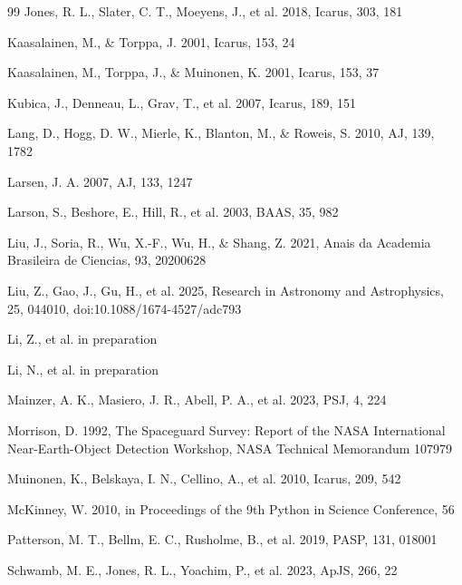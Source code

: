 \documentclass[referee]{raa}
\begin{document}
\begin{thebibliography}{99}
Jones, R. L., Slater, C. T., Moeyens, J., et al. 2018, Icarus, 303, 181

Kaasalainen, M., \& Torppa, J. 2001, Icarus, 153, 24

Kaasalainen, M., Torppa, J., \& Muinonen, K. 2001, Icarus, 153, 37

Kubica, J., Denneau, L., Grav, T., et al. 2007, Icarus, 189, 151

Lang, D., Hogg, D. W., Mierle, K., Blanton, M., \& Roweis, S. 2010, AJ, 139, 1782

Larsen, J. A. 2007, AJ, 133, 1247

Larson, S., Beshore, E., Hill, R., et al. 2003, BAAS, 35, 982

Liu, J., Soria, R., Wu, X.-F., Wu, H., \& Shang, Z. 2021, Anais da Academia Brasileira de Ciencias, 93, 20200628

Liu, Z., Gao, J., Gu, H., et al. 2025, Research in Astronomy and Astrophysics, 25, 044010, doi:10.1088/1674-4527/adc793

Li, Z., et al. in preparation

Li, N., et al. in preparation

Mainzer, A. K., Masiero, J. R., Abell, P. A., et al. 2023, PSJ, 4, 224

Morrison, D. 1992, The Spaceguard Survey: Report of the NASA International Near-Earth-Object Detection Workshop, NASA Technical Memorandum 107979

Muinonen, K., Belskaya, I. N., Cellino, A., et al. 2010, Icarus, 209, 542

McKinney, W. 2010, in Proceedings of the 9th Python in Science Conference, 56

Patterson, M. T., Bellm, E. C., Rusholme, B., et al. 2019, PASP, 131, 018001

Schwamb, M. E., Jones, R. L., Yoachim, P., et al. 2023, ApJS, 266, 22


\end{thebibliography}
\end{document}
